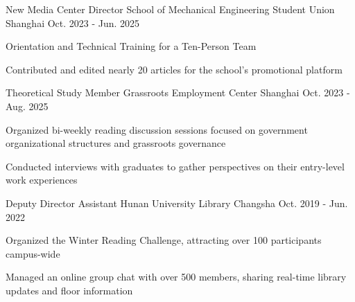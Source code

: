 \vspace{-2mm} 

\begin{cventries}
	
\vspace{1mm} 	


	\cventry
{New Media Center Director} %
{School of Mechanical Engineering Student Union} %
{Shanghai}%
{Oct. 2023 - Jun. 2025}
{
	\begin{cvitems} %
		\item{Orientation and Technical Training for a Ten-Person Team}
        \item {Contributed and edited nearly 20 articles for the school's promotional platform}
	\end{cvitems}
}

\vspace{4.0mm}  
\cventry
{ Theoretical Study Member} %
{Grassroots Employment Center} %
{Shanghai}
{Oct. 2023 - Aug. 2025}
{
	\begin{cvitems} %
		\item{Organized bi-weekly reading discussion sessions focused on government organizational structures and grassroots governance}
        \item{Conducted interviews with graduates to gather perspectives on their entry-level work experiences}
	\end{cvitems}
} 
\end{cventries}

\vspace{4.0mm}  

	\cventry
{Deputy Director Assistant} %
{Hunan University Library} %
{Changsha}
{Oct. 2019 - Jun. 2022}
{
	\begin{cvitems} %
		\item{Organized the Winter Reading Challenge, attracting over 100 participants campus-wide}
        \item {Managed an online group chat with over 500 members, sharing real-time library updates and floor information}
	\end{cvitems}
}

